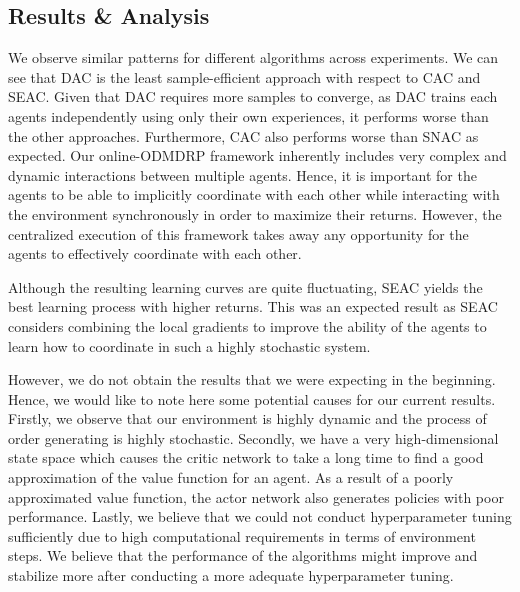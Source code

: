 \documentclass{article}
\theoremstyle{defn}
\theoremstyle{prop}
\theoremstyle{assm}
\theoremstyle{theoremm}
\theoremstyle{remarkk}
\theoremstyle{lem}
\theoremstyle{example}
\theoremstyle{example}
\begin{document}
\subsection{Results \& Analysis}\label{analysis}
We observe similar patterns for different algorithms across experiments. We can see that DAC is the least sample-efficient approach with respect to CAC and SEAC. Given that DAC requires more samples to converge, as DAC trains each agents independently using only their own experiences, it performs worse than the other approaches. Furthermore, CAC also performs worse than SNAC as expected. Our online-ODMDRP framework inherently includes very complex and dynamic interactions between multiple agents. Hence, it is important for the agents to be able to implicitly coordinate with each other while interacting with the environment synchronously in order to maximize their returns. However, the centralized execution of this framework takes away any opportunity for the agents to effectively coordinate with each other.

Although the resulting learning curves are quite fluctuating, SEAC yields the best learning process with higher returns. This was an expected result as SEAC considers combining the local gradients to improve the ability of the agents to learn how to coordinate in such a highly stochastic system. 

However, we do not obtain the results that we were expecting in the beginning. Hence, we would like to note here some potential causes for our current results. Firstly, we observe that our environment is highly dynamic and the process of order generating is highly stochastic. Secondly, we have a very high-dimensional state space which causes the critic network to take a long time to find a good approximation of the value function for an agent. As a result of a poorly approximated value function, the actor network also generates policies with poor performance. Lastly, we believe that we could not conduct hyperparameter tuning sufficiently due to high computational requirements in terms of environment steps. We believe that the performance of the algorithms might improve and stabilize more after conducting a more adequate hyperparameter tuning.

\end{document}
